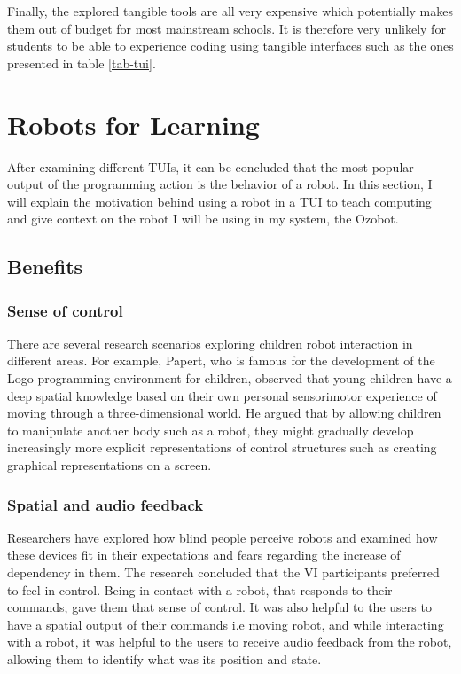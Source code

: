 \documentclass[oneside,%
                    author={Malak Hajji},
                    degree={BSc},
                    title={Designing An Accessible Computational Toolkit For Students},
                  subtitle={With Mixed Visual Abilities}]{dissertation}
\begin{document}
Finally, the explored tangible tools are all very expensive which potentially makes them out of budget for most mainstream schools. It is therefore very unlikely for students to be able to experience coding using tangible interfaces such as the ones presented in table \ref{tab-tui}.

\section{Robots for Learning}

After examining different TUIs, it can be concluded that the most popular output of the programming action is the behavior of a robot. In this section, I will explain the motivation behind using a robot in a TUI to teach computing and give context on the robot I will be using in my system, the Ozobot.

\subsection{Benefits}

\subsubsection{Sense of control}
There are several research scenarios exploring children robot interaction in different areas. For example, Papert, who is famous for the development of the Logo programming environment for children, observed that young children have a deep spatial knowledge based on their own personal sensorimotor experience of moving through a three-dimensional world. He argued that by allowing children to manipulate another body such as a robot, they might gradually develop increasingly more explicit representations of control structures such as creating graphical representations on a screen.\cite{papert}
\subsubsection{Spatial and audio feedback}
Researchers have explored how blind people perceive robots and examined how these devices fit in their expectations and fears regarding the increase of dependency in them\cite{feedback}. The research concluded that the VI participants preferred to feel in control. Being in contact with a robot, that responds to their commands, gave them that sense of control. It was also helpful to the users to have a spatial output of their commands i.e moving robot, and while interacting with a robot, it was helpful to the users to receive audio feedback from the robot, allowing them to identify what was its position and state. 
\end{document}
